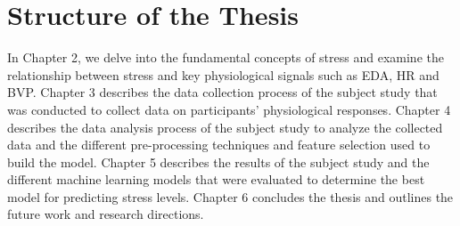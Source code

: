 \section{Structure of the Thesis}
  In Chapter 2, we delve into the fundamental concepts of stress and examine the relationship between stress and key physiological signals such as \gls{EDA}, \gls{HR} and \gls{BVP}. Chapter 3 describes the data collection process of the subject study that was conducted to collect data on participants' physiological responses. Chapter 4 describes the data analysis process of the subject study  to analyze the collected data and the different pre-processing techniques and feature selection used to build the model. Chapter 5 describes the results of the subject study and the different machine learning models that were evaluated to determine the best model for predicting stress levels. Chapter 6 concludes the thesis and outlines the future work and research directions.
  

  
 
 